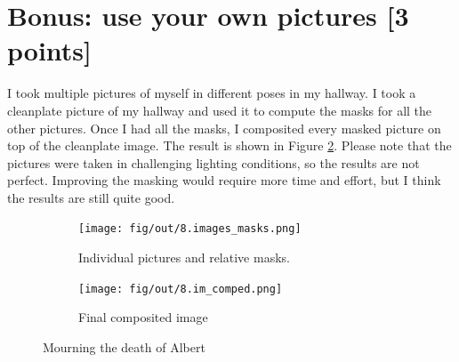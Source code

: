 \documentclass[tikz,14pt,fleqn]{article}
\begin{document}
\section{Bonus: use your own pictures [3 points]}
I took multiple pictures of myself in different poses in my hallway. I took a cleanplate picture of my hallway and used it to compute the masks for all the other pictures. Once I had all the masks, I composited every masked picture on top of the cleanplate image. The result is shown in Figure \ref{fig:8.mourning}. Please note that the pictures were taken in challenging lighting conditions, so the results are not perfect. Improving the masking would require more time and effort, but I think the results are still quite good.
\begin{figure}[h!]
    \centering
    \begin{subfigure}{.69\textwidth}
        \centering
        \texttt{[image: fig/out/8.images\_masks.png]}
        \caption{Individual pictures and relative masks.}
    \end{subfigure}
    \begin{subfigure}{0.3\textwidth}
        \centering
        \texttt{[image: fig/out/8.im\_comped.png]}
        \caption{Final composited image}
        \label{fig:8.mourning}
    \end{subfigure}
    \caption{Mourning the death of Albert}

\end{figure}
\end{document}
